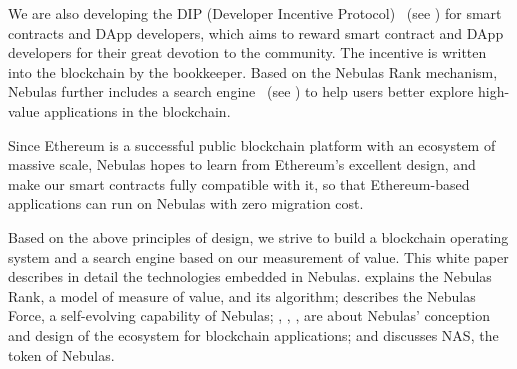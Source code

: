 \begin{itemize}
We are also developing the DIP (Developer Incentive Protocol) ~(see ) for smart contracts and DApp developers, which aims to reward smart contract and DApp developers for their great devotion to the community. The incentive is written into the blockchain by the bookkeeper. Based on the Nebulas Rank mechanism, Nebulas further includes a search engine ~(see ) to help users better explore high-value applications in the blockchain.
\end{itemize}

Since Ethereum is a successful public blockchain platform with an ecosystem of massive scale, Nebulas hopes to learn from Ethereum's excellent design, and make our smart contracts fully compatible with it, so that Ethereum-based applications can run on Nebulas with zero migration cost.


Based on the above principles of design, we strive to build a blockchain operating system and a search engine based on our measurement of value. This white paper describes in detail the technologies embedded in Nebulas.  explains the Nebulas Rank, a model of measure of value, and its algorithm;  describes the Nebulas Force, a self-evolving capability of Nebulas; , , ,  are about Nebulas’ conception and design of the ecosystem for blockchain applications; and  discusses NAS, the token of Nebulas.
